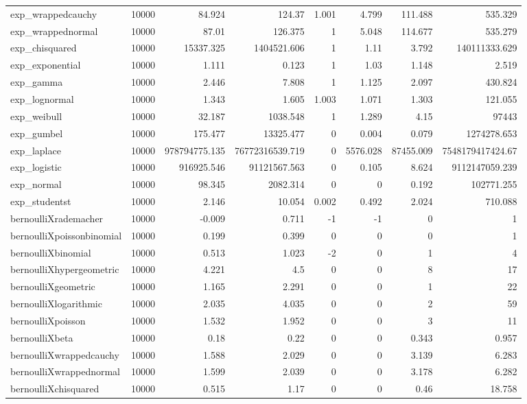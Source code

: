 \begin{table}[!htbp]
{\begin{tabular}{lrrrrrrr}
exp\_wrappedcauchy & 10000 & 84.924 & 124.37 & 1.001 & 4.799 & 111.488 & 535.329 \\ 
exp\_wrappednormal & 10000 & 87.01 & 126.375 & 1 & 5.048 & 114.677 & 535.279 \\ 
exp\_chisquared & 10000 & 15337.325 & 1404521.606 & 1 & 1.11 & 3.792 & 140111333.629 \\ 
exp\_exponential & 10000 & 1.111 & 0.123 & 1 & 1.03 & 1.148 & 2.519 \\ 
exp\_gamma & 10000 & 2.446 & 7.808 & 1 & 1.125 & 2.097 & 430.824 \\ 
exp\_lognormal & 10000 & 1.343 & 1.605 & 1.003 & 1.071 & 1.303 & 121.055 \\ 
exp\_weibull & 10000 & 32.187 & 1038.548 & 1 & 1.289 & 4.15 & 97443 \\ 
exp\_gumbel & 10000 & 175.477 & 13325.477 & 0 & 0.004 & 0.079 & 1274278.653 \\ 
exp\_laplace & 10000 & 978794775.135 & 76772316539.719 & 0 & 5576.028 & 87455.009 & 7548179417424.67 \\ 
exp\_logistic & 10000 & 916925.546 & 91121567.563 & 0 & 0.105 & 8.624 & 9112147059.239 \\ 
exp\_normal & 10000 & 98.345 & 2082.314 & 0 & 0 & 0.192 & 102771.255 \\ 
exp\_studentst & 10000 & 2.146 & 10.054 & 0.002 & 0.492 & 2.024 & 710.088 \\ 
bernoulliXrademacher & 10000 & -0.009 & 0.711 & -1 & -1 & 0 & 1 \\ 
bernoulliXpoissonbinomial & 10000 & 0.199 & 0.399 & 0 & 0 & 0 & 1 \\ 
bernoulliXbinomial & 10000 & 0.513 & 1.023 & -2 & 0 & 1 & 4 \\ 
bernoulliXhypergeometric & 10000 & 4.221 & 4.5 & 0 & 0 & 8 & 17 \\ 
bernoulliXgeometric & 10000 & 1.165 & 2.291 & 0 & 0 & 1 & 22 \\ 
bernoulliXlogarithmic & 10000 & 2.035 & 4.035 & 0 & 0 & 2 & 59 \\ 
bernoulliXpoisson & 10000 & 1.532 & 1.952 & 0 & 0 & 3 & 11 \\ 
bernoulliXbeta & 10000 & 0.18 & 0.22 & 0 & 0 & 0.343 & 0.957 \\ 
bernoulliXwrappedcauchy & 10000 & 1.588 & 2.029 & 0 & 0 & 3.139 & 6.283 \\ 
bernoulliXwrappednormal & 10000 & 1.599 & 2.039 & 0 & 0 & 3.178 & 6.282 \\ 
bernoulliXchisquared & 10000 & 0.515 & 1.17 & 0 & 0 & 0.46 & 18.758 \\ 

\end{tabular}}
\end{table}
